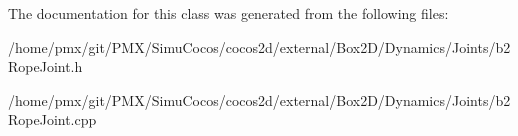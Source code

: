 The documentation for this class was generated from the following files\+:\begin{DoxyCompactItemize}
\item 
/home/pmx/git/\+P\+M\+X/\+Simu\+Cocos/cocos2d/external/\+Box2\+D/\+Dynamics/\+Joints/b2\+Rope\+Joint.\+h\item 
/home/pmx/git/\+P\+M\+X/\+Simu\+Cocos/cocos2d/external/\+Box2\+D/\+Dynamics/\+Joints/b2\+Rope\+Joint.\+cpp\end{DoxyCompactItemize}
